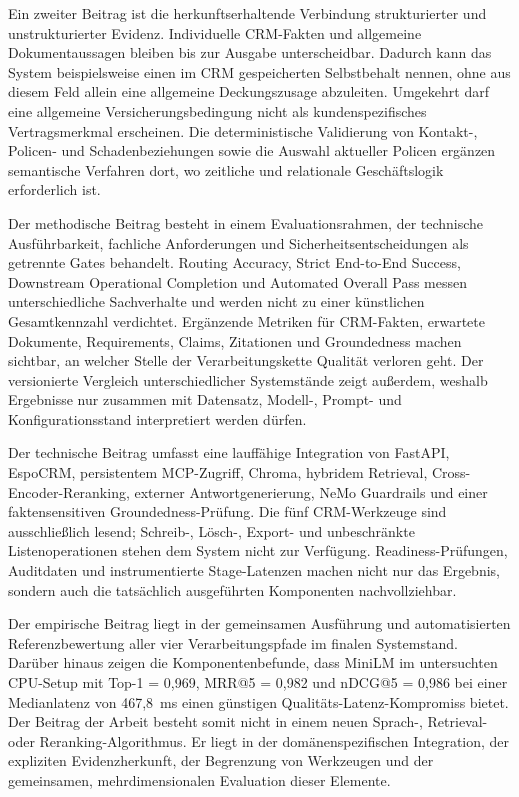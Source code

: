 Ein zweiter Beitrag ist die herkunftserhaltende Verbindung strukturierter und unstrukturierter Evidenz. Individuelle CRM-Fakten und allgemeine Dokumentaussagen bleiben bis zur Ausgabe unterscheidbar. Dadurch kann das System beispielsweise einen im CRM gespeicherten Selbstbehalt nennen, ohne aus diesem Feld allein eine allgemeine Deckungszusage abzuleiten. Umgekehrt darf eine allgemeine Versicherungsbedingung nicht als kundenspezifisches Vertragsmerkmal erscheinen. Die deterministische Validierung von Kontakt-, Policen- und Schadenbeziehungen sowie die Auswahl aktueller Policen ergänzen semantische Verfahren dort, wo zeitliche und relationale Geschäftslogik erforderlich ist.

Der methodische Beitrag besteht in einem Evaluationsrahmen, der technische Ausführbarkeit, fachliche Anforderungen und Sicherheitsentscheidungen als getrennte Gates behandelt. Routing Accuracy, Strict End-to-End Success, Downstream Operational Completion und Automated Overall Pass messen unterschiedliche Sachverhalte und werden nicht zu einer künstlichen Gesamtkennzahl verdichtet. Ergänzende Metriken für CRM-Fakten, erwartete Dokumente, Requirements, Claims, Zitationen und Groundedness machen sichtbar, an welcher Stelle der Verarbeitungskette Qualität verloren geht. Der versionierte Vergleich unterschiedlicher Systemstände zeigt außerdem, weshalb Ergebnisse nur zusammen mit Datensatz, Modell-, Prompt- und Konfigurationsstand interpretiert werden dürfen.

Der technische Beitrag umfasst eine lauffähige Integration von FastAPI, EspoCRM, persistentem MCP-Zugriff, Chroma, hybridem Retrieval, Cross-Encoder-Reranking, externer Antwortgenerierung, NeMo Guardrails und einer faktensensitiven Groundedness-Prüfung. Die fünf CRM-Werkzeuge sind ausschließlich lesend; Schreib-, Lösch-, Export- und unbeschränkte Listenoperationen stehen dem System nicht zur Verfügung. Readiness-Prüfungen, Auditdaten und instrumentierte Stage-Latenzen machen nicht nur das Ergebnis, sondern auch die tatsächlich ausgeführten Komponenten nachvollziehbar.

Der empirische Beitrag liegt in der gemeinsamen Ausführung und automatisierten Referenzbewertung aller vier Verarbeitungspfade im finalen Systemstand. Darüber hinaus zeigen die Komponentenbefunde, dass MiniLM im untersuchten CPU-Setup mit Top-1 = 0{,}969, MRR@5 = 0{,}982 und nDCG@5 = 0{,}986 bei einer Medianlatenz von 467{,}8~ms einen günstigen Qualitäts-Latenz-Kompromiss bietet. Der Beitrag der Arbeit besteht somit nicht in einem neuen Sprach-, Retrieval- oder Reranking-Algorithmus. Er liegt in der domänenspezifischen Integration, der expliziten Evidenzherkunft, der Begrenzung von Werkzeugen und der gemeinsamen, mehrdimensionalen Evaluation dieser Elemente.

